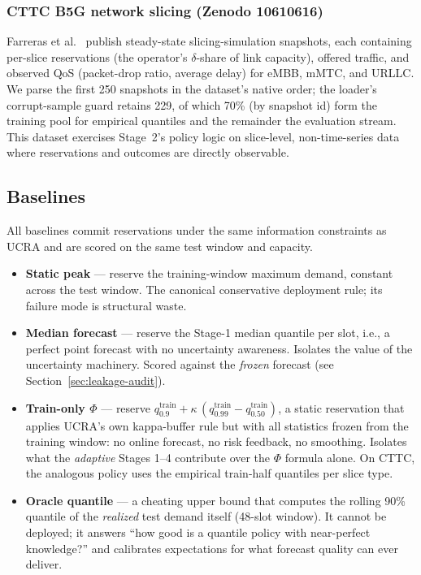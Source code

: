 \subsubsection{CTTC B5G network slicing (Zenodo 10610616)}
Farreras et al.~\cite{farreras2024cttc} publish steady-state
slicing-simulation snapshots, each containing per-slice reservations
(the operator's $\delta$-share of link capacity), offered traffic,
and observed QoS (packet-drop ratio, average delay) for eMBB, mMTC,
and URLLC. We parse the first 250 snapshots in the dataset's native
order; the loader's corrupt-sample guard retains 229, of which 70\%
(by snapshot id) form the training pool for empirical quantiles and
the remainder the evaluation stream. This dataset exercises
Stage~2's policy logic on slice-level, non-time-series data where
reservations and outcomes are directly observable.

\subsection{Baselines}

All baselines commit reservations under the same information
constraints as UCRA and are scored on the same test window and
capacity.

\begin{itemize}
\item \textbf{Static peak} --- reserve the training-window maximum
demand, constant across the test window. The canonical conservative
deployment rule; its failure mode is structural waste.
\item \textbf{Median forecast} --- reserve the Stage-1 median
quantile per slot, i.e., a perfect point forecast with no uncertainty
awareness. Isolates the value of the uncertainty machinery. Scored
against the \emph{frozen} forecast (see
Section~\ref{sec:leakage-audit}).
\item \textbf{Train-only $\Phi$} --- reserve
$q^{\text{train}}_{0.9} + \kappa\,(q^{\text{train}}_{0.99} -
q^{\text{train}}_{0.50})$, a static reservation that applies UCRA's
own kappa-buffer rule but with all statistics frozen from the
training window: no online forecast, no risk feedback, no smoothing.
Isolates what the \emph{adaptive} Stages 1--4 contribute over the
$\Phi$ formula alone. On CTTC, the analogous policy uses the
empirical train-half quantiles per slice type.
\item \textbf{Oracle quantile} --- a cheating upper bound that
computes the rolling 90\% quantile of the \emph{realized} test
demand itself (48-slot window). It cannot be deployed; it answers
``how good is a quantile policy with near-perfect knowledge?'' and
calibrates expectations for what forecast quality can ever deliver.
\end{itemize}

